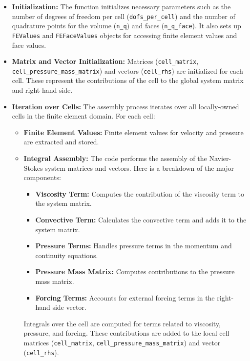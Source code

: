 \documentclass{article}
\begin{document}
\begin{itemize}
    \item \textbf{Initialization:} The function initializes necessary parameters such as the number of degrees of freedom per cell (\texttt{dofs\_per\_cell}) and the number of quadrature points for the volume (\texttt{n\_q}) and faces (\texttt{n\_q\_face}). It also sets up \texttt{FEValues} and \texttt{FEFaceValues} objects for accessing finite element values and face values.

    \item \textbf{Matrix and Vector Initialization:} Matrices (\texttt{cell\_matrix}, \texttt{cell\_pressure\_mass\_matrix}) and vectors (\texttt{cell\_rhs}) are initialized for each cell. These represent the contributions of the cell to the global system matrix and right-hand side.

    \item \textbf{Iteration over Cells:} The assembly process iterates over all locally-owned cells in the finite element domain. For each cell:
        \begin{itemize}
            \item \textbf{Finite Element Values:} Finite element values for velocity and pressure are extracted and stored.
            
            \item \textbf{Integral Assembly:} The code performs the assembly of the Navier-Stokes system matrices and vectors. Here is a breakdown of the major components:

\begin{itemize}
  \item \textbf{Viscosity Term:} Computes the contribution of the viscosity term to the system matrix.
  \item \textbf{Convective Term:} Calculates the convective term and adds it to the system matrix.
  \item \textbf{Pressure Terms:} Handles pressure terms in the momentum and continuity equations.
  \item \textbf{Pressure Mass Matrix:} Computes contributions to the pressure mass matrix.
  \item \textbf{Forcing Terms:} Accounts for external forcing terms in the right-hand side vector.
\end{itemize}
            Integrals over the cell are computed for terms related to viscosity, pressure, and forcing. These contributions are added to the local cell matrices (\texttt{cell\_matrix}, \texttt{cell\_pressure\_mass\_matrix}) and vector (\texttt{cell\_rhs}).
            

\end{itemize}
\end{itemize}
\end{document}
